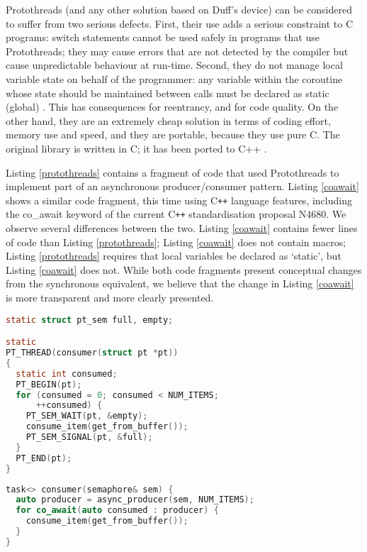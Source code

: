 Protothreads (and any other solution based on Duff’s device) can be considered to suffer from two serious defects. First, their use adds a serious constraint to C programs: switch statements cannot be used safely in programs that use Protothreads; they may cause errors that are not detected by the compiler but cause unpredictable behaviour at run-time. Second, they do not manage local variable state on behalf of the programmer: any variable within the coroutine whose state should be maintained between calls must be declared as static (global) \cite{Dunkels2005b}. This has consequences for reentrancy, and for code quality. On the other hand, they are an extremely cheap solution in terms of coding effort, memory use and speed, and they are portable, because they use pure C. The original library is written in C; it has been ported to C++ \cite{Paisley2006}.

Listing \ref{protothreads} contains a fragment of code that used Protothreads to implement part of an asynchronous producer/consumer pattern. Listing \ref{coawait} shows a similar code fragment, this time using C{}\verb!++! language features, including the co\_await keyword of the current C{}\verb!++! standardisation proposal N4680. We observe several differences between the two. Listing \ref{coawait} contains fewer lines of code than Listing \ref{protothreads}; Listing \ref{coawait} does not contain macros; Listing \ref{protothreads} requires that local variables be declared as ‘static’, but Listing \ref{coawait} does not. While both code fragments present conceptual changes from the synchronous equivalent, we believe that the change in Listing \ref{coawait} is more transparent and more clearly presented.

\begin{lstlisting}[language=C, caption=Fragment of Protothreads code for asynchronous producer/consumer threads, label=protothreads]
static struct pt_sem full, empty;

static
PT_THREAD(consumer(struct pt *pt))
{
  static int consumed;
  PT_BEGIN(pt);
  for (consumed = 0; consumed < NUM_ITEMS; 
      ++consumed) {
    PT_SEM_WAIT(pt, &empty);
    consume_item(get_from_buffer());
    PT_SEM_SIGNAL(pt, &full);
  }
  PT_END(pt);
}
\end{lstlisting}

\begin{lstlisting}[language=C++, caption=C++ code fragment using co\_await for asynchronous producer/consumer threads, label=coawait]
task<> consumer(semaphore& sem) {
  auto producer = async_producer(sem, NUM_ITEMS);
  for co_await(auto consumed : producer) {
    consume_item(get_from_buffer());
  }
}
\end{lstlisting}

